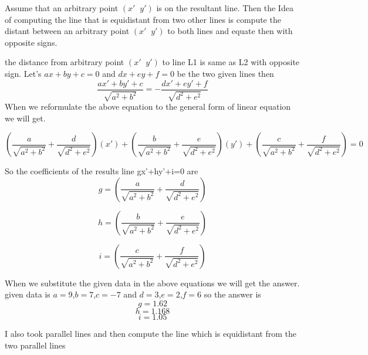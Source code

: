 \documentclass[journal,12pt,twocolumn]{IEEEtran}
\begin{document}
Assume that an arbitrary point $(x'\;\;y')$ is on the resultant line. Then the Idea of computing the line that is equidistant from two other lines is compute the distant between an arbitrary point $(x'\;\;y')$ to both lines and equate then with opposite signs.

the distance from arbitrary point $(x'\;\;y')$ to line L1 is same as L2 with opposite sign. Let's $ax+by+c=0$ and $dx+ey+f=0$ be the two given lines then
\begin{equation}
    \frac{ax'+by'+c}{\sqrt{{a}^2 +{b}^2}} = - \frac{dx'+ey'+f}{\sqrt{{d}^2 +{e}^2}}
\end{equation}
When we reformulate the above equation to the general form of linear equation we will get.

\begin{equation}
    (\frac{a}{{\sqrt{{a}^2 +{b}^2}}} + \frac{d}{{\sqrt{{d}^2 +{e}^2}}})(x') + (\frac{b}{{\sqrt{{a}^2 +{b}^2}}} + \frac{e}{{\sqrt{{d}^2 +{e}^2}}})(y') + (\frac{c}{{\sqrt{{a}^2 +{b}^2}}} + \frac{f}{{\sqrt{{d}^2 +{e}^2}}}) = 0
\end{equation}

So the coefficients of the results line gx'+hy'+i=0 are
\begin{equation}
    g=(\frac{a}{{\sqrt{{a}^2 +{b}^2}}} + \frac{d}{{\sqrt{{d}^2 +{e}^2}}})
\end{equation}
 
\begin{equation}
    h=(\frac{b}{{\sqrt{{a}^2 +{b}^2}}} + \frac{e}{{\sqrt{{d}^2 +{e}^2}}})
\end{equation}

\begin{equation}
    i=(\frac{c}{{\sqrt{{a}^2 +{b}^2}}} + \frac{f}{{\sqrt{{d}^2 +{e}^2}}})
\end{equation}

When we substitute the given data in the above equations we will get the answer. given data is
$a=9$,$b=7$,$c=-7$ and $d=3$,$e=2$,$f=6$
so the answer is 
\begin{equation}
    g= 1.62
\end{equation}
\begin{equation}
    h= 1.168
\end{equation}
\begin{equation}
    i= 1.05
\end{equation}

I also took parallel lines and then compute the line which is equidistant from the two parallel lines
\end{document}
